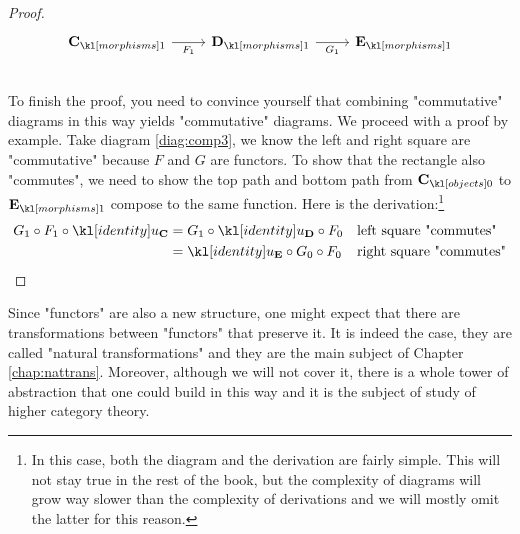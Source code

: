 \documentclass[main.tex]{subfiles}
\begin{document}
\begin{proof}
\begin{minipage}{0.49\textwidth}
\begin{equation}
\begin{tikzcd}
					\mor{\mathbf{C}} \arrow[r, "F_1"']                  & \mor{\mathbf{D}} \arrow[r, "G_1"']                 & \mor{\mathbf{E}}                 
				\end{tikzcd}
		\end{equation}
	\end{minipage}\\
	To finish the proof, you need to convince yourself that combining "commutative" diagrams in this way yields "commutative" diagrams. We proceed with a proof by example. Take diagram \eqref{diag:comp3}, we know the left and right square are "commutative" because $F$ and $G$ are functors. To show that the rectangle also "commutes", we need to show the top path and bottom path from $\obj{\mathbf{C}}$ to $\mor{\mathbf{E}}$ compose to the same function. Here is the derivation:\footnote{In this case, both the diagram and the derivation are fairly simple. This will not stay true in the rest of the book, but the complexity of diagrams will grow way slower than the complexity of derivations and we will mostly omit the latter for this reason.}
	\begin{align*}
		G_1 \circ F_1 \circ \idu_{\mathbf{C}} &= G_1 \circ \idu_{\mathbf{D}} \circ F_0 &&\text{left square "commutes"}\\
		&= \idu_{\mathbf{E}} \circ G_0 \circ F_0&&\text{right square "commutes"}
	\end{align*}
\end{proof}
Since "functors" are also a new structure, one might expect that there are transformations between "functors" that preserve it. It is indeed the case, they are called "natural transformations" and they are the main subject of Chapter \ref{chap:nattrans}. Moreover, although we will not cover it, there is a whole tower of abstraction that one could build in this way and it is the subject of study of higher category theory.
\end{document}
